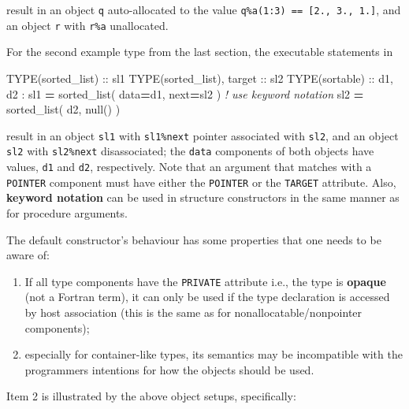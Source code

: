 \documentclass[
]{article}
\newenvironment{Shaded}{}{}
\newcommand{\CommentTok}[1]{\textcolor[rgb]{0.38,0.63,0.69}{\textit{#1}}}
\newcommand{\DataTypeTok}[1]{\textcolor[rgb]{0.56,0.13,0.00}{#1}}
\newcommand{\KeywordTok}[1]{\textcolor[rgb]{0.00,0.44,0.13}{\textbf{#1}}}
\newcommand{\NormalTok}[1]{#1}
\providecommand{\tightlist}{%
  \setlength{\itemsep}{0pt}\setlength{\parskip}{0pt}}
\begin{document}
result in an object \texttt{q} auto-allocated to the value
\texttt{q\%a(1:3)\ ==\ {[}2.,\ 3.,\ 1.{]}}, and an object \texttt{r}
with \texttt{r\%a} unallocated.

For the second example type from the last section, the executable
statements in

\begin{Shaded}
\begin{Highlighting}[]
\DataTypeTok{TYPE(sorted\_list)} \DataTypeTok{::}\NormalTok{ sl1}
\DataTypeTok{TYPE(sorted\_list)}\NormalTok{, }\DataTypeTok{target} \DataTypeTok{::}\NormalTok{ sl2}
\DataTypeTok{TYPE(sortable)} \DataTypeTok{::}\NormalTok{ d1, d2}
\NormalTok{:}
\NormalTok{sl1 }\KeywordTok{=}\NormalTok{ sorted\_list( data}\KeywordTok{=}\NormalTok{d1, next}\KeywordTok{=}\NormalTok{sl2 )  }\CommentTok{! use keyword notation}
\NormalTok{sl2 }\KeywordTok{=}\NormalTok{ sorted\_list( d2, null() )}
\end{Highlighting}
\end{Shaded}

result in an object \texttt{sl1} with \texttt{sl1\%next} pointer
associated with \texttt{sl2}, and an object \texttt{sl2} with
\texttt{sl2\%next} disassociated; the \texttt{data} components of both
objects have values, \texttt{d1} and \texttt{d2}, respectively. Note
that an argument that matches with a \texttt{POINTER} component must
have either the \texttt{POINTER} or the \texttt{TARGET} attribute. Also,
\textbf{keyword notation} can be used in structure constructors in the
same manner as for procedure arguments.

The default constructor's behaviour has some properties that one needs
to be aware of:

\begin{enumerate}
\def\labelenumi{\arabic{enumi}.}
\tightlist
\item
  If all type components have the \texttt{PRIVATE} attribute i.e., the
  type is \textbf{opaque} (not a Fortran term), it can only be used if
  the type declaration is accessed by host association (this is the same
  as for nonallocatable/nonpointer components);
\item
  especially for container-like types, its semantics may be incompatible
  with the programmers intentions for how the objects should be used.
\end{enumerate}

Item 2 is illustrated by the above object setups, specifically:
\end{document}
